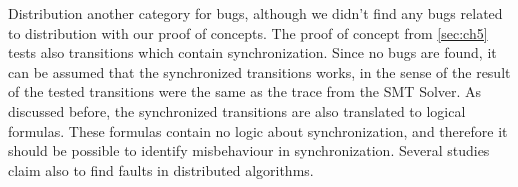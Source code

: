 Distribution another category for bugs, although we didn't find any bugs related to distribution with our proof of concepts. The proof of concept from \autoref{sec:ch5} tests also transitions which contain synchronization. Since no bugs are found, it can be assumed that the synchronized transitions works, in the sense of the result of the tested transitions were the same as the trace from the SMT Solver. As discussed before, the synchronized transitions are also translated to logical formulas. These formulas contain no logic about synchronization, and therefore it should be possible to identify misbehaviour in synchronization. Several studies claim also to find faults in distributed algorithms.

